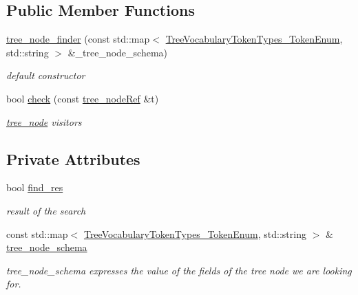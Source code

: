 \subsection*{Public Member Functions}
\begin{DoxyCompactItemize}
\item 
\hyperlink{structtree__node__finder_ae98f28a15f13df7f86818718d3e84457}{tree\+\_\+node\+\_\+finder} (const std\+::map$<$ \hyperlink{token__interface_8hpp_a14502d0757789149f644966ca931b126}{Tree\+Vocabulary\+Token\+Types\+\_\+\+Token\+Enum}, std\+::string $>$ \&\+\_\+tree\+\_\+node\+\_\+schema)
\begin{DoxyCompactList}\small\item\em default constructor \end{DoxyCompactList}\item 
bool \hyperlink{structtree__node__finder_ac06e16fcd94b5b20a811f72e87e48579}{check} (const \hyperlink{tree__node_8hpp_a6ee377554d1c4871ad66a337eaa67fd5}{tree\+\_\+node\+Ref} \&t)
\begin{DoxyCompactList}\small\item\em \hyperlink{classtree__node}{tree\+\_\+node} visitors \end{DoxyCompactList}\end{DoxyCompactItemize}
\subsection*{Private Attributes}
\begin{DoxyCompactItemize}
\item 
bool \hyperlink{structtree__node__finder_a774eb82d34641de3b0b6b0ab800bc9f9}{find\+\_\+res}
\begin{DoxyCompactList}\small\item\em result of the search \end{DoxyCompactList}\item 
const std\+::map$<$ \hyperlink{token__interface_8hpp_a14502d0757789149f644966ca931b126}{Tree\+Vocabulary\+Token\+Types\+\_\+\+Token\+Enum}, std\+::string $>$ \& \hyperlink{structtree__node__finder_af926baf8d6d39b33dcbdf5167454411a}{tree\+\_\+node\+\_\+schema}
\begin{DoxyCompactList}\small\item\em tree\+\_\+node\+\_\+schema expresses the value of the fields of the tree node we are looking for. \end{DoxyCompactList}\end{DoxyCompactItemize}


